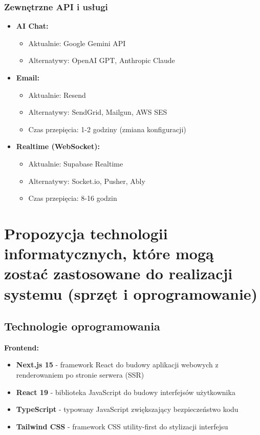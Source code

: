 \documentclass[12pt,a4paper]{article}
\begin{document}
\subsubsection{Zewnętrzne API i usługi}

\begin{itemize}[leftmargin=*]
    \item \textbf{AI Chat:} 
    \begin{itemize}
        \item Aktualnie: Google Gemini API
        \item Alternatywy: OpenAI GPT, Anthropic Claude
        
    \end{itemize}
    \item \textbf{Email:}
    \begin{itemize}
        \item Aktualnie: Resend
        \item Alternatywy: SendGrid, Mailgun, AWS SES
        \item Czas przepięcia: 1-2 godziny (zmiana konfiguracji)
    \end{itemize}
    \item \textbf{Realtime (WebSocket):}
    \begin{itemize}
        \item Aktualnie: Supabase Realtime
        \item Alternatywy: Socket.io, Pusher, Ably
        \item Czas przepięcia: 8-16 godzin
    \end{itemize}
\end{itemize}






\section{Propozycja technologii informatycznych, które mogą zostać zastosowane do realizacji systemu (sprzęt i oprogramowanie)}

\subsection{Technologie oprogramowania}

\textbf{Frontend:}
\begin{itemize}[leftmargin=*]
    \item \textbf{Next.js 15} - framework React do budowy aplikacji webowych z renderowaniem po stronie serwera (SSR)
    \item \textbf{React 19} - biblioteka JavaScript do budowy interfejsów użytkownika
    \item \textbf{TypeScript} - typowany JavaScript zwiększający bezpieczeństwo kodu
    \item \textbf{Tailwind CSS} - framework CSS utility-first do stylizacji interfejsu
    
    
\end{itemize}
\end{document}
